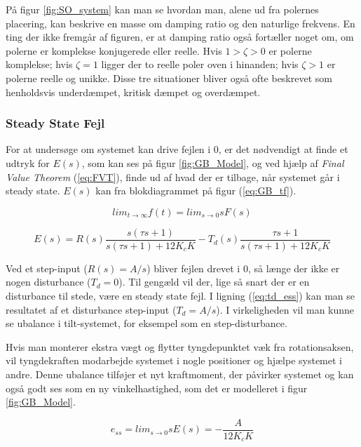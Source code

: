 På figur \ref{fig:SO_system} kan man se hvordan man, alene ud fra polernes placering, kan beskrive en masse om damping ratio og den naturlige frekvens. En ting der ikke fremgår af figuren, er at damping ratio også fortæller noget om, om polerne er komplekse konjugerede eller reelle. Hvis $1>\zeta>0$ er polerne komplekse; hvis $\zeta=1$ ligger der to reelle poler oven i hinanden; hvis $\zeta>1$ er polerne reelle og unikke. Disse tre situationer bliver også ofte beskrevet som henholdsvis underdæmpet, kritisk dæmpet og overdæmpet.




\subsubsection{Steady State Fejl}

For at undersøge om systemet kan drive fejlen i 0, er det nødvendigt at finde et udtryk for $E(s)$, som kan ses på figur \ref{fig:GB_Model}, og ved hjælp af \textit{Final Value Theorem} (\ref{eq:FVT}), finde ud af hvad der er tilbage, når systemet går i steady state. $E(s)$ kan fra blokdiagrammet på figur (\ref{eq:GB_tf}).

\begin{equation} \label{eq:FVT}
lim_{t \to \infty} f(t) = lim_{s \to 0} sF(s)
\end{equation}

\begin{equation} \label{eq:ess}
E(s)=R(s)\frac{s(\tau s+1)}{s(\tau s+1)+12K_{c}K}-T_{d}(s)\frac{\tau s+1}{s(\tau s+1)+12K_{c}K}
\end{equation}

Ved et step-input ($R(s)=A/s$) bliver fejlen drevet i 0, så længe der ikke er nogen disturbance ($T_{d}=0$). Til gengæld vil der, lige så snart der er en disturbance til stede, være en steady state fejl. I ligning (\ref{eq:td_ess}) kan man se resultatet af et disturbance step-input ($T_{d}=A/s$). I virkeligheden vil man kunne se ubalance i tilt-systemet, for eksempel som en step-disturbance.

Hvis man monterer ekstra vægt og flytter tyngdepunktet væk fra rotationsaksen, vil tyngdekraften modarbejde systemet i nogle positioner og hjælpe systemet i andre. Denne ubalance tilføjer et nyt kraftmoment, der påvirker systemet og kan også godt ses som en ny vinkelhastighed, som det er modelleret i figur \ref{fig:GB_Model}.

\begin{equation}\label{eq:td_ess}
e_{ss}=lim_{s \to 0} sE(s)=-\frac{A}{12K_{c}K}
\end{equation}

